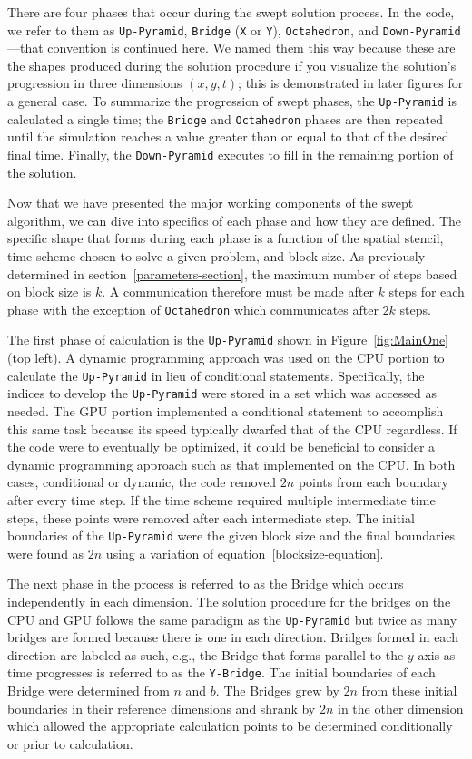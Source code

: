 \documentclass[mca,article,submit,moreauthors,pdftex]{Definitions/mdpi}
\def\Up{\texttt{Up-Pyramid}}
\def\Down{\texttt{Down-Pyramid}}
\def\Oct{\texttt{Octahedron}}
\def\Yb{\texttt{Y-Bridge}}
\begin{document}
\begin{paracol}{2}
There are four phases that occur during the swept solution process. In the code, we refer to them as \Up{}, \texttt{Bridge} (\texttt{X} or \texttt{Y}), \Oct{}, and \Down{}---that convention is continued here. We named them this way because these are the shapes produced during the solution procedure if you visualize the solution's progression in three dimensions $(x,y,t)$; this is demonstrated in later figures for a general case. To summarize the progression of swept phases, the \Up{} is calculated a single time; the \texttt{Bridge} and \Oct{} phases are then repeated until the simulation reaches a value greater than or equal to that of the desired final time. Finally, the \Down{} executes to fill in the remaining portion of the solution. 

Now that we have presented the major working components of the swept algorithm, we can dive into specifics of each phase and how they are defined. The specific shape that forms during each phase is a function of the spatial stencil, time scheme chosen to solve a given problem, and block size. As previously determined in section~\ref{parameters-section}, the maximum number of steps based on block size is $k$. A communication therefore must be made after $k$ steps for each phase with the exception of \Oct{} which communicates after $2k$ steps.
 
The first phase of calculation is the \Up{} shown in Figure~\ref{fig:MainOne} (top left). A dynamic programming approach was used on the CPU portion to calculate the \Up{} in lieu of conditional statements. Specifically, the indices to develop the \Up{} were stored in a set which was accessed as needed. The GPU portion implemented a conditional statement to accomplish this same task because its speed typically dwarfed that of the CPU regardless. If the code were to eventually be optimized, it could be beneficial to consider a dynamic programming approach such as that implemented on the CPU. In both cases, conditional or dynamic, the code removed $2n$ points from each boundary after every time step. If the time scheme required multiple intermediate time steps, these points were removed after each intermediate step. The initial boundaries of the \Up{} were the given block size and the final boundaries were found as $2n$ using a variation of equation~\ref{blocksize-equation}.

The next phase in the process is referred to as the Bridge which occurs independently in each dimension. The solution procedure for the bridges on the CPU and GPU follows the same paradigm as the \Up{} but twice as many bridges are formed because there is one in each direction. Bridges formed in each direction are labeled as such, e.g., the Bridge that forms parallel to the $y$ axis as time progresses is referred to as the \Yb{}. The initial boundaries of each Bridge were determined from $n$ and $b$. The Bridges grew by $2n$ from these initial boundaries in their reference dimensions and shrank by $2n$ in the other dimension which allowed the appropriate calculation points to be determined conditionally or prior to calculation.

\newpage
\end{paracol}
\nointerlineskip
\end{document}
